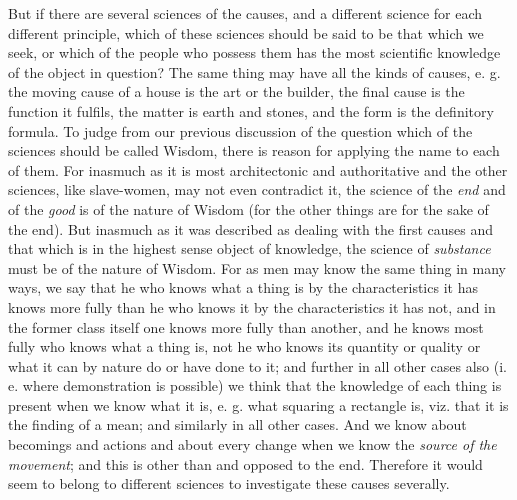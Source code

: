 But if there are several sciences of the causes, and a different science for each different principle, which of these sciences should be said to be that which we seek, or which of the people who possess them has the most scientific knowledge of the object in question? The same thing may have all the kinds of causes, e. g. the moving cause of a house is the art or the builder, the final cause is the function it fulfils, the matter is earth and stones, and the form is the definitory formula. To judge from our previous discussion of the question which of the sciences should be called Wisdom, there is reason for applying the name to each of them. For inasmuch as it is most architectonic and authoritative and the other sciences, like slave-women, may not even contradict it, the science of the \emph{end} and of the \emph{good} is of the nature of Wisdom (for the other things are for the sake of the end). But inasmuch as it was described as dealing with the first causes and that which is in the highest sense object of knowledge, the science of \emph{substance} must be of the nature of Wisdom. For as men may know the same thing in many ways, we say that he who knows what a thing is by the characteristics it has knows more fully than he who knows it by the characteristics it has not, and in the former class itself one knows more fully than another, and he knows most fully who knows what a thing is, not he who knows its quantity or quality or what it can by nature do or have done to it; and further in all other cases also (i. e. where demonstration is possible) we think that the knowledge of each thing is present when we know what it is, e. g. what squaring a rectangle is, viz. that it is the finding of a mean; and similarly in all other cases. And we know about becomings and actions and about every change when we know the \emph{source of the movement}; and this is other than and opposed to the end. Therefore it would seem to belong to different sciences to investigate these causes severally.

